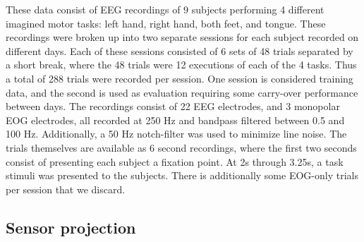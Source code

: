 \documentclass[fleqn,10pt]{wlscirep}
\begin{document}
These data consist of EEG recordings of 9 subjects performing 4 different imagined motor tasks: left hand, right hand, both feet, and tongue. These recordings were broken up into two separate sessions for each subject recorded on different days. Each of these sessions consisted of 6 sets of 48 trials separated by a short break, where the 48 trials were 12 executions of each of the 4 tasks. Thus a total of 288 trials were recorded per session. One session is considered training data, and the second is used as evaluation requiring some carry-over performance between days. The recordings consist of 22 EEG electrodes, and 3 monopolar EOG electrodes, all recorded at 250 Hz and bandpass filtered between 0.5 and 100 Hz. Additionally, a 50 Hz notch-filter was used to minimize line noise. The trials themselves are available as 6 second recordings, where the first two seconds consist of presenting each subject a fixation point. At 2s through 3.25s, a task stimuli was presented to the subjects. There is additionally some EOG-only trials per session that we discard. 


\subsection*{Sensor projection}\label{sec:sens_proj}
\end{document}
